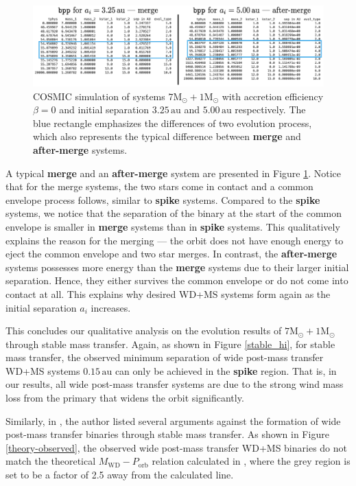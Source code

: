 \documentclass[12pt]{article}
\newcommand{\Msun}{\mathrm{M_{\odot}}}
\newcommand{\au}{\, \mathrm{au}}
\begin{document}
\begin{figure}
    \centering
    \includegraphics[width=\linewidth]{fig/merge-after-merge.png}
    \caption{COSMIC simulation of systems $7 \Msun + 1 \Msun$ with accretion efficiency $\beta = 0$ and initial separation $3.25 \au$ and $5.00 \au$ respectively. The blue rectangle emphasizes the differences of two evolution process, which also represents the typical difference between \textbf{merge} and \textbf{after-merge} systems.}
    \label{merge-after-merge}
\end{figure}

A typical \textbf{merge} and an \textbf{after-merge} system are presented in Figure \ref{merge-after-merge}. Notice that for the merge systems, the two stars come in contact and a common envelope process follows, similar to \textbf{spike} systems. Compared to the \textbf{spike} systems, we notice that the separation of the binary at the start of the common envelope is smaller in \textbf{merge} systems than in \textbf{spike} systems. This qualitatively explains the reason for the merging — the orbit does not have enough energy to eject the common envelope and two star merges. In contrast, the \textbf{after-merge} systems possesses more energy than the \textbf{merge} systems due to their larger initial separation. Hence, they either survives the common envelope or do not come into contact at all. This explains why desired WD+MS systems form again as the initial separation $a_i$ increases.

This concludes our qualitative analysis on the evolution results of $7\Msun + 1\Msun$ through stable mass transfer. Again, as shown in Figure \ref{stable_hi}, for stable mass transfer, the observed minimum separation of wide post-mass transfer WD+MS systems $0.15 \au$ can only be achieved in the \textbf{spike} region. That is, in our results, all wide post-mass transfer systems are due to the strong wind mass loss from the primary that widens the orbit significantly.

Similarly, in \cite{yamaguchi_lo}, the author listed several arguments against the formation of wide post-mass transfer binaries through stable mass transfer. As shown in Figure \ref{theory-observed}, the observed wide post-mass transfer WD+MS binaries do not match the theoretical $M_{\mathrm{WD}} - P_{\mathrm{orb}}$ relation calculated in \cite{rappaport1995relation}, where the grey region is set to be a factor of 2.5 away from the calculated line.
\end{document}
